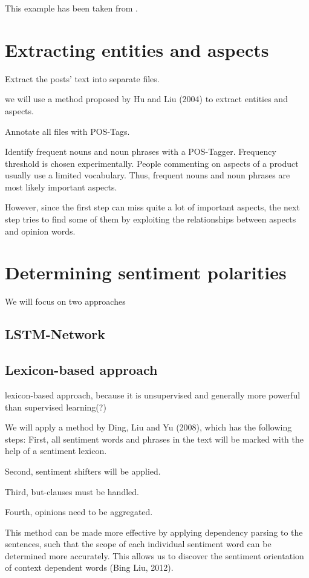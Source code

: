 \documentclass[10pt,a4paper]{article}
\begin{document}
		This example has been taken from \cite{dependency}.
	
	\section{Extracting entities and aspects}
	
	Extract the posts' text into separate files.
	
	we will use a method proposed by Hu and Liu (2004) to extract entities and aspects.
	
	Annotate all files with POS-Tags.
	
	Identify frequent nouns and noun phrases with a POS-Tagger. Frequency threshold is chosen experimentally. People commenting on aspects of a product usually use a limited vocabulary. Thus, frequent nouns and noun phrases are most likely important aspects.
	
	However, since the first step can miss quite a lot of important aspects, the next step tries to find some of them by exploiting the relationships between aspects and opinion words.
	
	\section{Determining sentiment polarities}
	We will focus on two approaches
	
		\subsection{LSTM-Network}
		
		\subsection{Lexicon-based approach}
		lexicon-based approach, because it is unsupervised and generally more powerful than supervised learning(?)
		
		We will apply a method by Ding, Liu and Yu (2008), which has the following steps: First, all sentiment words and phrases in the text will be marked with the help of a sentiment lexicon.
		
		Second, sentiment shifters will be applied.
		
		Third, but-clauses must be handled.
		
		Fourth, opinions need to be aggregated.
	
		This method can be made more effective by applying dependency parsing to the sentences, such that the scope of each individual sentiment word can be determined more accurately. This allows us to discover the sentiment orientation of context dependent words (Bing Liu, 2012).
\end{document}
